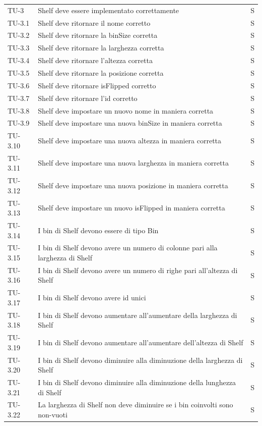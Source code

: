 \begin{xltabular}{0.9\textwidth}{X | p{0.6\textwidth} | p{0.1\textwidth} }
    TU-3 & Shelf deve essere implementato correttamente & S\\
    TU-3.1 & Shelf deve ritornare il nome corretto & S\\
    TU-3.2 & Shelf deve ritornare la binSize corretta & S\\
    TU-3.3 & Shelf deve ritornare la larghezza corretta & S\\
    TU-3.4 & Shelf deve ritornare l'altezza corretta & S\\
    TU-3.5 & Shelf deve ritornare la posizione corretta & S\\
    TU-3.6 & Shelf deve ritornare isFlipped corretto & S\\
    TU-3.7 & Shelf deve ritornare l'id corretto & S\\
    TU-3.8 & Shelf deve impostare un nuovo nome in maniera corretta & S\\
    TU-3.9 & Shelf deve impostare una nuova binSize in maniera corretta & S\\
    TU-3.10 & Shelf deve impostare una nuova altezza in maniera corretta & S\\
    TU-3.11 & Shelf deve impostare una nuova larghezza in maniera corretta & S\\
    TU-3.12 & Shelf deve impostare una nuova posizione in maniera corretta & S\\
    TU-3.13 & Shelf deve impostare un nuovo isFlipped in maniera corretta & S\\
    TU-3.14 & I bin di Shelf devono essere di tipo Bin & S\\
    TU-3.15 & I bin di Shelf devono avere un numero di colonne pari alla larghezza di Shelf & S\\
    TU-3.16 & I bin di Shelf devono avere un numero di righe pari all'altezza di Shelf & S\\
    TU-3.17 & I bin di Shelf devono avere id unici & S\\
    TU-3.18 & I bin di Shelf devono aumentare all'aumentare della larghezza di Shelf & S\\
    TU-3.19 & I bin di Shelf devono aumentare all'aumentare dell'altezza di Shelf & S\\
    TU-3.20 & I bin di Shelf devono diminuire alla diminuzione della larghezza di Shelf & S\\
    TU-3.21 & I bin di Shelf devono diminuire alla diminuzione della lunghezza di Shelf & S\\
    TU-3.22 & La larghezza di Shelf non deve diminuire se i bin coinvolti sono non-vuoti & S\\

\end{xltabular}
